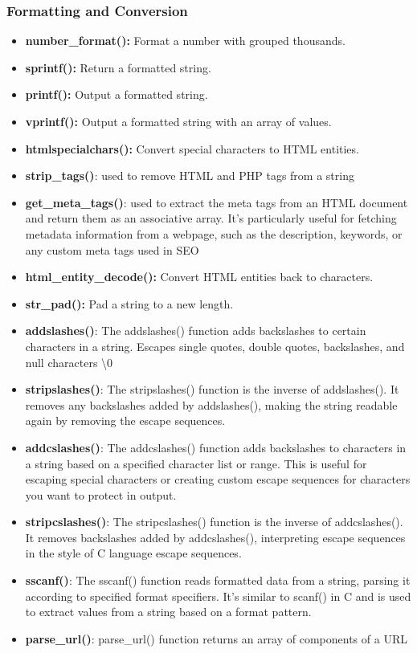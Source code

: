 \documentclass{report}
\begin{document}
\pagebreak 
\subsubsection{Formatting and Conversion}
\begin{itemize}
    \item \textbf{number\_format():} Format a number with grouped thousands.
    \item \textbf{sprintf():} Return a formatted string.
    \item \textbf{printf():} Output a formatted string.
    \item \textbf{vprintf():} Output a formatted string with an array of values.
    \item \textbf{htmlspecialchars():} Convert special characters to HTML entities.
    \item \textbf{strip\_tags()}: used to remove HTML and PHP tags from a string
    \item \textbf{get\_meta\_tags()}: used to extract the meta tags from an HTML document and return them as an associative array. It’s particularly useful for fetching metadata information from a webpage, such as the description, keywords, or any custom meta tags used in SEO
    \item \textbf{html\_entity\_decode():} Convert HTML entities back to characters.
    \item \textbf{str\_pad():} Pad a string to a new length.
    \item \textbf{addslashes()}: The addslashes() function adds backslashes to certain characters in a string. Escapes single quotes, double quotes, backslashes, and null characters  \textbackslash 0
    \item \textbf{stripslashes()}: The stripslashes() function is the inverse of addslashes(). It removes any backslashes added by addslashes(), making the string readable again by removing the escape sequences.
    \item \textbf{addcslashes()}: The addcslashes() function adds backslashes to characters in a string based on a specified character list or range. This is useful for escaping special characters or creating custom escape sequences for characters you want to protect in output.
    \item \textbf{stripcslashes()}: The stripcslashes() function is the inverse of addcslashes(). It removes backslashes added by addcslashes(), interpreting escape sequences in the style of C language escape sequences.
    \item \textbf{sscanf()}: The sscanf() function reads formatted data from a string, parsing it according to specified format specifiers. It's similar to scanf() in C and is used to extract values from a string based on a format pattern.
    \item \textbf{parse\_url()}:  parse\_url() function returns an array of components of a URL
\end{itemize}
\end{document}
